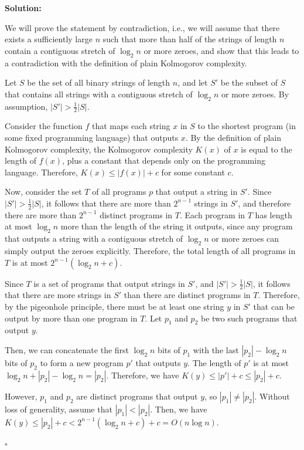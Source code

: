\documentclass[10pt]{article}
\newenvironment{solution}{\textbf{Solution:}}{\hfill$\square$}
\begin{document}
\begin{enumerate}
    \begin{solution}

    We will prove the statement by contradiction, i.e., we will assume that there exists a sufficiently large $n$ such that more than half of the strings of length $n$ contain a contiguous stretch of $\log_2 n$ or more zeroes, and show that this leads to a contradiction with the definition of plain Kolmogorov complexity.

Let $S$ be the set of all binary strings of length $n$, and let $S'$ be the subset of $S$ that contains all strings with a contiguous stretch of $\log_2 n$ or more zeroes. By assumption, $|S'| > \frac{1}{2}|S|$.

Consider the function $f$ that maps each string $x$ in $S$ to the shortest program (in some fixed programming language) that outputs $x$. By the definition of plain Kolmogorov complexity, the Kolmogorov complexity $K(x)$ of $x$ is equal to the length of $f(x)$, plus a constant that depends only on the programming language. Therefore, $K(x) \leq |f(x)| + c$ for some constant $c$.

Now, consider the set $T$ of all programs $p$ that output a string in $S'$. Since $|S'| > \frac{1}{2}|S|$, it follows that there are more than $2^{n-1}$ strings in $S'$, and therefore there are more than $2^{n-1}$ distinct programs in $T$. Each program in $T$ has length at most $\log_2 n$ more than the length of the string it outputs, since any program that outputs a string with a contiguous stretch of $\log_2 n$ or more zeroes can simply output the zeroes explicitly. Therefore, the total length of all programs in $T$ is at most $2^{n-1}(\log_2 n + c)$.

Since $T$ is a set of programs that output strings in $S'$, and $|S'| > \frac{1}{2}|S|$, it follows that there are more strings in $S'$ than there are distinct programs in $T$. Therefore, by the pigeonhole principle, there must be at least one string $y$ in $S'$ that can be output by more than one program in $T$. Let $p_1$ and $p_2$ be two such programs that output $y$.

Then, we can concatenate the first $\log_2 n$ bits of $p_1$ with the last $|p_2| - \log_2 n$ bits of $p_2$ to form a new program $p'$ that outputs $y$. The length of $p'$ is at most $\log_2 n + |p_2| - \log_2 n = |p_2|$. Therefore, we have $K(y) \leq |p'| + c \leq |p_2| + c$.

However, $p_1$ and $p_2$ are distinct programs that output $y$, so $|p_1| \neq |p_2|$. Without loss of generality, assume that $|p_1| < |p_2|$. Then, we have $K(y) \leq |p_2| + c < 2^{n-1}(\log_2 n + c) + c = O(n\log n)$.


\end{solution}
\end{enumerate}
\end{document}
